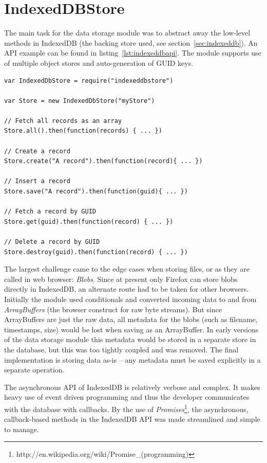 \section{IndexedDBStore}
\label{sec:indexeddbstore}

The main task for the data storage module was to abstract away the low-level methods in IndexedDB (the backing store used, see section~\ref{sec:indexeddb}). An API example can be found in listing~\ref{lst:indexeddbapi}. The module supports use of multiple object stores and auto-generation of GUID keys.

\begin{Code}
\begin{lstlisting}[caption={Common database operations}, label={lst:indexeddbapi}]
var IndexedDbStore = require("indexeddbstore")

var Store = new IndexedDbStore("myStore")

// Fetch all records as an array
Store.all().then(function(records) { ... })

// Create a record
Store.create("A record").then(function(record){ ... })

// Insert a record
Store.save("A record").then(function(guid){ ... })

// Fetch a record by GUID
Store.get(guid).then(function(record) { ... })

// Delete a record by GUID
Store.destroy(guid).then(function(record) { ... })
\end{lstlisting}
\end{Code}

The largest challenge came to the edge cases when storing files, or as they are called in web browser: \emph{Blobs}. Since at present only Firefox can store blobs directly in IndexedDB, an alternate route had to be taken for other browsers. Initially the module used conditionals and converted incoming data to and from \emph{ArrayBuffers} (the browser construct for raw byte streams). But since ArrayBuffers are just the raw data, all metadata for the blobs (such as filename, timestamps, size) would be lost when saving as an ArrayBuffer. In early versions of the data storage module this metadata would be stored in a separate store in the database, but this was too tightly coupled and was removed. The final implementation is storing data as-is – any metadata must be saved explicitly in a separate operation.

The asynchronous API of IndexedDB is relatively verbose and complex. It makes heavy use of event driven programming and thus the developer communicates with the database with callbacks. By the use of \emph{Promises}\footnote{http://en.wikipedia.org/wiki/Promise\_(programming)}, the asynchronous, callback-based methods in the IndexedDB API was made streamlined and simple to manage.

